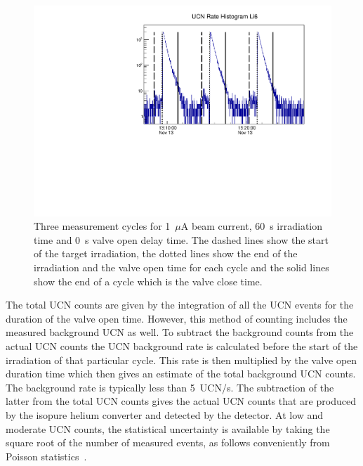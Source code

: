 \begin{figure}[h!]
  \centering
  \includegraphics[width=1.0\textwidth]{UCNRate_with_lines_logy.pdf}
  \caption{Three measurement cycles for 1~$\mu$A beam current, 60~s
    irradiation time and 0~s valve open delay time. The dashed lines
    show the start of the target irradiation, the dotted lines show
    the end of the irradiation and the valve open time for each cycle
    and the solid lines show the end of a cycle which is the valve
    close time.}
  \label{fig:UCNRate_with_lines}
\end{figure}

The total UCN counts are given by the integration of all the UCN
events for the duration of the valve open time. However, this method
of counting includes the measured background UCN as well. To subtract
the background counts from the actual UCN counts the UCN background
rate is calculated before the start of the irradiation of that
particular cycle. This rate is then multiplied by the valve open
duration time which then gives an estimate of the total background UCN
counts. The background rate is typically less than 5~UCN/s. The
subtraction of the latter from the total UCN counts gives the actual
UCN counts that are produced by the isopure helium converter and
detected by the detector. At low and moderate UCN counts, the
statistical uncertainty is available by taking the square root of the
number of measured events, as follows conveniently from Poisson
statistics~\cite{pomme2015uncertainty}.
